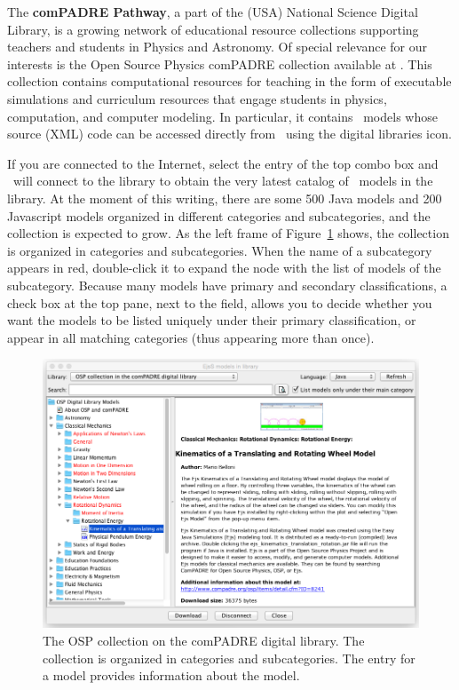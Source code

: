 The \textbf{comPADRE Pathway}, a part of the (USA) National Science Digital Library, is a growing network of educational resource collections supporting teachers and students in Physics and Astronomy. Of special relevance for our interests is the Open Source Physics comPADRE collection available at . This collection contains computational resources for teaching in the form of executable simulations and curriculum resources that engage students in physics, computation, and computer modeling. In particular, it contains \ejs\ models whose source (XML) code can be accessed directly from \ejs\ using the digital libraries icon.

If you are connected to the Internet, select the  entry of the top combo box and \ejs\ will connect to the library to obtain the very latest catalog of \ejs\ models in the library. At the moment of this writing, there are some 500 Java models and  200 Javascript models organized in different categories and subcategories, and the collection is expected to grow. As the left frame of Figure~\ref{fig:01Introduction/OSPCollection} shows, the collection is organized in categories and subcategories. When the name of a subcategory appears in red, double-click it to expand the node with the list of models of the subcategory. Because many models have primary and secondary classifications, a check box at the top pane, next to the  field, allows you to decide whether you want the models to be listed uniquely under their primary classification, or appear in all matching categories (thus appearing more than once).

\begin{figure}[htb]
    \centering
  \includegraphics[scale=\scale]{01Introduction/images/OSPCollection.png}
    \caption{The OSP collection on the comPADRE digital library. The collection is organized in categories and subcategories. The entry for a model provides information about the model.}
    \label{fig:01Introduction/OSPCollection}
\end{figure}

